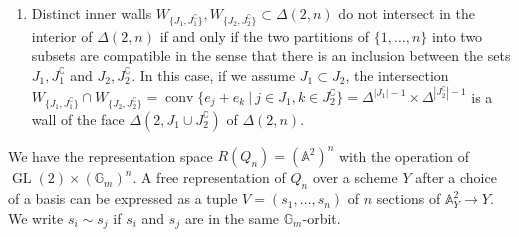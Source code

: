 \documentclass[ALCO,ThmDefs,Unicode,epreuves]{cedram}
\def\A{\mathds A}
\def\G{\mathds G}
\DeclareMathOperator{\GL}{GL}
\DeclareMathOperator{\conv}{conv}
\begin{document}
\begin{rema}
\begin{enumerate}[label=(\arabic*)]
\item\label{rema2.2_4} %
Distinct inner walls $W_{\{J_1,J_1^\complement\}},W_{\{J_2,J_2^\complement\}}
\subset\Delta(2,n)$ do not intersect in the interior of $\Delta(2,n)$ 
if and only if the two partitions of $\{1,\ldots,n\}$ into two subsets 
are compatible in the sense that there is an inclusion between the sets
$J_1,J_1^\complement$ and $J_2,J_2^\complement$.
In this case, if we assume $J_1\subset J_2$, the intersection
$W_{\{J_1,J_1^\complement\}}\cap W_{\{J_2,J_2^\complement\}}
=\conv\{e_j+e_k\:|\:j\in J_1,k\in J_2^\complement\}
=\Delta^{|J_1|-1}\times\Delta^{|J_2^\complement|-1}$
is a wall of the face $\Delta(2,J_1\cup J_2^\complement)$
of $\Delta(2,n)$.
\end{enumerate}
\end{rema}

We have the representation space $R(Q_n)=(\A^2)^n$ with the operation of 
$\GL(2)\times(\G_m)^n$. A free representation of $Q_n$ over a scheme $Y$ 
after a choice of a basis can be expressed as a tuple $V=(s_1,\ldots,s_n)$ 
of $n$ sections of $\A^2_Y\to Y$. 
We write $s_i\sim s_j$ if $s_i$ and $s_j$ are in the same $\G_m$-orbit.
\end{document}
